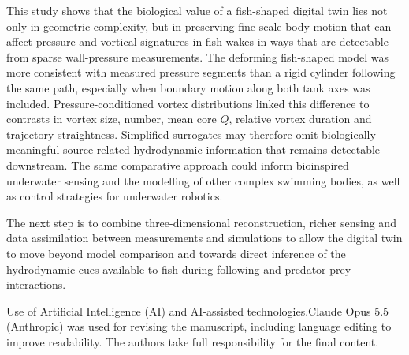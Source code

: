 \documentclass[openacc]{rsproca_new}
\providecommand{\aiuse}[1]{{\vskip5.5pt\noindent \textcolor{jobcolor}{\fontsize{9}{11}\selectfont Use of Artificial Intelligence (AI) and AI-assisted technologies.}\fontsize{8}{11}\selectfont\enskip #1}}
\begin{document}
This study shows that the biological value of a fish-shaped digital twin lies not only in geometric complexity, but in
preserving fine-scale body motion that can affect pressure and vortical signatures in fish wakes in ways that are detectable from sparse wall-pressure measurements. The deforming fish-shaped model was more consistent with measured pressure segments than a rigid cylinder following the same path, especially when boundary motion along both tank axes was included. Pressure-conditioned vortex distributions linked this difference to contrasts in vortex size, number, mean core $Q$, relative vortex duration and trajectory straightness. Simplified surrogates may therefore omit biologically meaningful source-related hydrodynamic information that remains detectable downstream. The same comparative approach could inform bioinspired underwater sensing and the modelling of other complex swimming bodies, as well as control strategies for underwater robotics.

The next step is to combine three-dimensional reconstruction, richer sensing and data assimilation between measurements and simulations to allow the digital twin to move beyond model comparison and towards direct inference of the hydrodynamic cues available to fish during following and predator-prey interactions.

\enlargethispage{20pt}



\aiuse{Claude Opus 5.5 (Anthropic) was used for revising the manuscript, including language editing to improve readability. The authors take full responsibility for the final content.}
\end{document}
